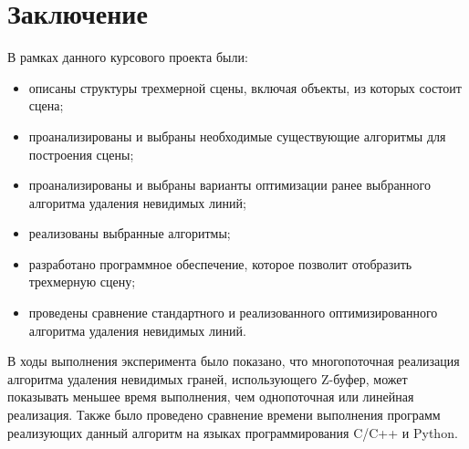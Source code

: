 \chapter*{Заключение}

В рамках данного курсового проекта были: 
\begin{itemize}
	\item описаны структуры трехмерной сцены, включая объекты, из которых состоит сцена;
	\item проанализированы и выбраны необходимые существующие алгоритмы для построения сцены;
	\item проанализированы и выбраны варианты оптимизации ранее выбранного алгоритма удаления невидимых линий; 
	\item реализованы выбранные алгоритмы; 
	\item разработано программное обеспечение, которое позволит отобразить трехмерную сцену; 
	\item проведены сравнение стандартного и реализованного оптимизированного алгоритма удаления невидимых линий. 
\end{itemize}

В ходы выполнения эксперимента было показано, что многопоточная реализация алгоритма удаления невидимых граней, использующего Z-буфер, может показывать меньшее время выполнения, чем однопоточная или линейная реализация. Также было проведено сравнение времени выполнения программ реализующих данный алгоритм на языках программирования C/C++ и Python.